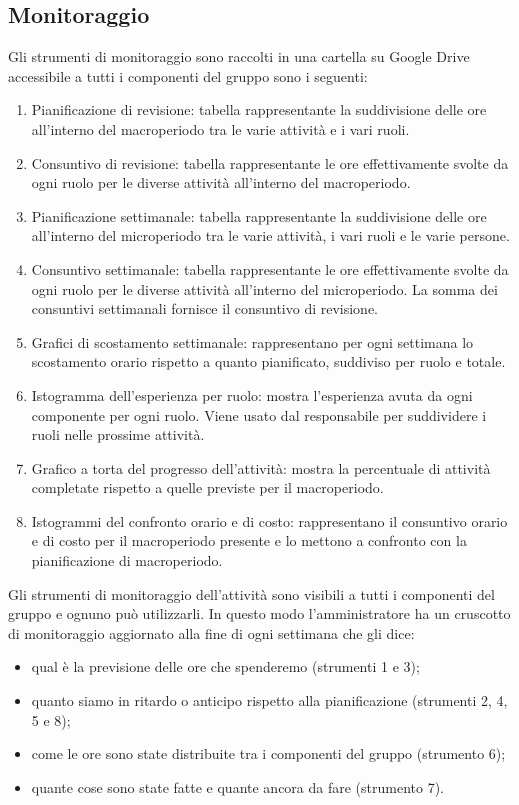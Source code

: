 \subsection{Monitoraggio}
Gli strumenti di monitoraggio sono raccolti in una cartella su Google Drive accessibile a tutti i componenti del gruppo sono i seguenti:
\begin{enumerate}
	\item Pianificazione di revisione: tabella rappresentante la suddivisione delle ore all'interno del macroperiodo tra le varie attività e i vari ruoli.
	\item Consuntivo di revisione: tabella rappresentante le ore effettivamente svolte da ogni ruolo per le diverse attività all'interno del macroperiodo.
	\item Pianificazione settimanale: tabella rappresentante la suddivisione delle ore all'interno del microperiodo tra le varie attività, i vari ruoli e le varie persone.
	\item Consuntivo settimanale: tabella rappresentante le ore effettivamente svolte da ogni ruolo per le diverse attività all'interno del microperiodo. La somma dei consuntivi settimanali fornisce il consuntivo di revisione.
	\item Grafici di scostamento settimanale: rappresentano per ogni settimana lo scostamento orario rispetto a quanto pianificato, suddiviso per ruolo e totale.
	\item Istogramma dell'esperienza per ruolo: mostra l'esperienza avuta da ogni componente per ogni ruolo. Viene usato dal responsabile per suddividere i ruoli nelle prossime attività.
	\item Grafico a torta del progresso dell'attività: mostra la percentuale di attività completate rispetto a quelle previste per il macroperiodo.
	\item Istogrammi del confronto orario e di costo: rappresentano il consuntivo orario e di costo per il macroperiodo presente e lo mettono a confronto con la pianificazione di macroperiodo.
\end{enumerate}

\noindent Gli strumenti di monitoraggio dell'attività sono visibili a tutti i componenti del gruppo e ognuno può utilizzarli. In questo modo l'amministratore ha un cruscotto di monitoraggio aggiornato alla fine di ogni settimana che gli dice:
\begin{itemize}
	\item qual è la previsione delle ore che spenderemo (strumenti 1 e 3);
	\item quanto siamo in ritardo o anticipo rispetto alla pianificazione (strumenti 2, 4, 5 e 8);
	\item come le ore sono state distribuite tra i componenti del gruppo (strumento 6);
	\item quante cose sono state fatte e quante ancora da fare (strumento 7).
\end{itemize}


